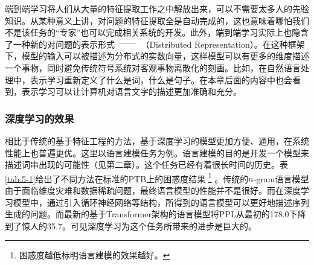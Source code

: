 \parinterval 端到端学习将人们从大量的特征提取工作之中解放出来，可以不需要太多人的先验知识。从某种意义上讲，对问题的特征提取全是自动完成的，这也意味着哪怕我们不是该任务的``专家''也可以完成相关系统的开发。此外，端到端学习实际上也隐含了一种新的对问题的表示形式\ $\dash$\ {\small{}}（Distributed Representation）。在这种框架下，模型的输入可以被描述为分布式的实数向量，这样模型可以有更多的维度描述一个事物，同时避免传统符号系统对客观事物离散化的刻画。比如，在自然语言处理中，表示学习重新定义了什么是词，什么是句子。在本章后面的内容中也会看到，表示学习可以让计算机对语言文字的描述更加准确和充分。


\subsubsection{深度学习的效果}

\parinterval 相比于传统的基于特征工程的方法，基于深度学习的模型更加方便、通用，在系统性能上也普遍更优。这里以语言建模任务为例。语言建模的目的是开发一个模型来描述词串出现的可能性（见第二章）。这个任务已经有着很长时间的历史。表\ref{tab:5-1}给出了不同方法在标准的PTB上的困惑度结果 \footnote{困惑度越低标明语言建模的效果越好。} 。传统的$ n$-gram语言模型由于面临维度灾难和数据稀疏问题，最终语言模型的性能并不是很好。而在深度学习模型中，通过引入循环神经网络等结构，所得到的语言模型可以更好地描述序列生成的问题。而最新的基于Transformer架构的语言模型将PPL从最初的178.0下降到了惊人的35.7。可见深度学习为这个任务所带来的进步是巨大的。


